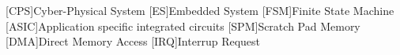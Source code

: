 \begin{acronym}[AAAAAA]
    [CPS]{Cyber-Physical System}
    [ES]{Embedded System}
    [FSM]{Finite State Machine}
    [ASIC]{Application specific integrated circuits}
    [SPM]{Scratch Pad Memory}
    [DMA]{Direct Memory Access}
    [IRQ]{Interrup Request}
\end{acronym}